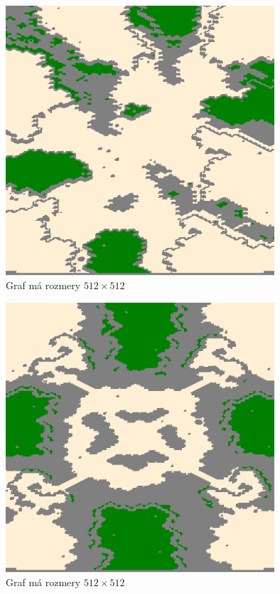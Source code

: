 \begin{figure}[H]
\centering
\includegraphics[width=10cm]{./img/Aftershock.png}
\caption{Graf  má rozmery $512 \times 512$}
\label{fig:aftershock_map}
\end{figure}

\begin{figure}[H]
\centering
\includegraphics[width=10cm]{./img/Brushfire.png}
\caption{Graf  má rozmery $512 \times 512$}
\label{fig:brushfire_map}
\end{figure}


